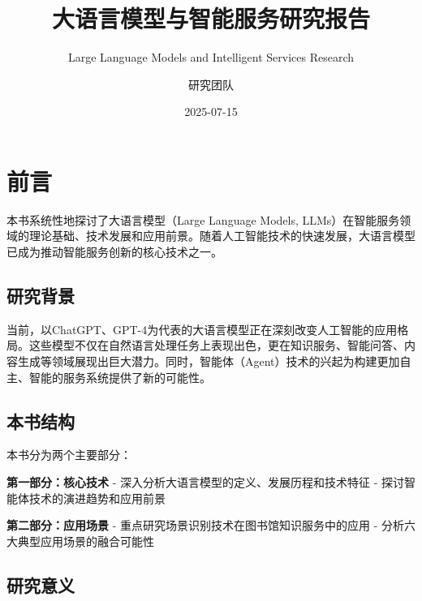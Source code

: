 \documentclass[
  letterpaper,
]{scrbook}
\title{大语言模型与智能服务研究报告}
\subtitle{Large Language Models and Intelligent Services Research}
\author{研究团队}
\date{2025-07-15}
\renewcommand*\contentsname{Table of contents}
\newcommand\contentsname{Table of contents}
\begin{document}
\frontmatter
\maketitle

\renewcommand*\contentsname{Table of contents}
{
\hypersetup{linkcolor=}
\setcounter{tocdepth}{2}
\tableofcontents
}

\mainmatter
{}

\chapter*{前言}\label{ux524dux8a00}


本书系统性地探讨了大语言模型（Large Language Models,
LLMs）在智能服务领域的理论基础、技术发展和应用前景。随着人工智能技术的快速发展，大语言模型已成为推动智能服务创新的核心技术之一。

\section*{研究背景}\label{ux7814ux7a76ux80ccux666f}


当前，以ChatGPT、GPT-4为代表的大语言模型正在深刻改变人工智能的应用格局。这些模型不仅在自然语言处理任务上表现出色，更在知识服务、智能问答、内容生成等领域展现出巨大潜力。同时，智能体（Agent）技术的兴起为构建更加自主、智能的服务系统提供了新的可能性。

\section*{本书结构}\label{ux672cux4e66ux7ed3ux6784}


本书分为两个主要部分：

\textbf{第一部分：核心技术} -
深入分析大语言模型的定义、发展历程和技术特征 -
探讨智能体技术的演进趋势和应用前景

\textbf{第二部分：应用场景} -
重点研究场景识别技术在图书馆知识服务中的应用 -
分析六大典型应用场景的融合可能性

\section*{研究意义}\label{ux7814ux7a76ux610fux4e49}
\end{document}

